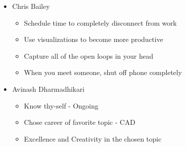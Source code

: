 \begin{itemize}
\item Chris Bailey
	\begin{itemize}
	\item Schedule time to completely disconnect from work
	\item Use visualizations to become more productive
	\item Capture all of the open loops in your head
	\item When you meet someone, shut off phone completely
	\end{itemize}

\item Avinash Dharmadhikari
	\begin{itemize}
	\item Know thy-self - Ongoing
	\item Chose career of favorite topic - CAD
	\item Excellence and Creativity in the chosen topic
	\end{itemize}


\end{itemize}
